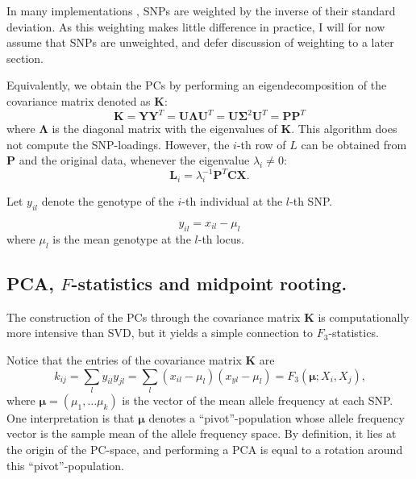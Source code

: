 \documentclass[10pt,a4paper]{article}
\newcommand{\MX}{\mathbf{X}} %
\newcommand{\MC}{\mathbf{C}} %
\newcommand{\MY}{\mathbf{Y}} %
\newcommand{\MP}{\mathbf{P}} %
\newcommand{\ML}{\mathbf{L}} %
\newcommand{\MK}{\mathbf{K}} %
\newcommand{\MSINGULAR}{\mathbf{\Sigma}} %
\newcommand{\MEIGEN}{\mathbf{\Lambda}} %
\newcommand{\MEAN}{\boldsymbol{\mu}} %
\begin{document}
	In many  implementations \citep[e.g]{patterson2006}, SNPs are weighted by the inverse of their standard deviation. As this weighting makes little difference in practice, I will for now assume that SNPs are unweighted, and defer discussion of weighting to a later section.
	
	Equivalently, we obtain the PCs by performing an eigendecomposition of the  covariance matrix denoted as $\MK$:
	 \begin{equation}
 \MK = \MY \MY^T = \mathbf{U}\MEIGEN\mathbf{U}^T = \mathbf{U}\MSINGULAR^2\mathbf{U}^T =\MP\MP^T
	\end{equation} where $\MEIGEN$ is the diagonal matrix with the eigenvalues of $\MK$. 
	This algorithm does not compute the SNP-loadings. However, the $i$-th row of $L$  can be obtained from $\MP$ and the original data, whenever the eigenvalue $\lambda_i \neq 0$:
	\begin{equation}
	\ML_i = \lambda_i^{-1}\MP^T\MC\MX \text{.}
	\end{equation}
	
	
	Let $y_{il}$ denote the genotype of the $i$-th individual at the $l$-th SNP.
	
	\begin{equation}
	y_{il} = x_{il} - \mu_l
	\end{equation}
	where $\mu_l$ is the mean genotype at the $l$-th locus.
	
	
	\subsection{PCA, $F$-statistics and midpoint rooting.}
    The construction of the PCs through the covariance matrix $\MK$ is computationally more intensive than SVD, but it yields a simple connection to $F_3$-statistics.

	Notice that the entries of the covariance matrix $\MK$ are
	\begin{equation}
	k_{ij} = \sum_l y_{il} y_{jl} = \sum_l (x_{il} - \mu_l)(x_{yl} - \mu_l) = F_3(\MEAN; X_i, X_j)\text{,}
	\end{equation}
	where $\MEAN = (\mu_1, \dots \mu_k)$ is the vector of the mean allele frequency at each SNP. One interpretation is that $\MEAN$ denotes a ``pivot''-population whose allele frequency vector is the sample mean of the allele frequency space. By definition, it lies at the origin of the PC-space, and performing a PCA is equal to a rotation around this ``pivot''-population.
	
	
	
\end{document}
